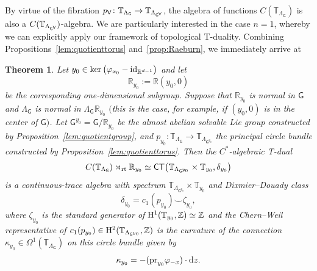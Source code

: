 \documentclass[10pt,a4paper]{amsart}
\numberwithin{equation}{section}
\newcommand{\C}{\complex}
\newcommand{\Z}{\zed}
\def\dd{{\rm d}}
\def\Id{{\rm id}}
\def\V{{\sf V}}
\def\T{{\sf T}}
\def\C{{\sf C}}
\newcommand{\sfG}{\mathsf{G}}
\newcommand{\rmH}{{\rm H}}
\newcommand{\rt}{{\rm rt}}
\newcommand{\R}{\real}
\newcommand{\complex}{{\mathbb C}} %
\newcommand{\zed}{{\mathbb Z}} %
\newcommand{\real}{{\mathbb R}} %
\newcommand{\torus}{{\mathbb T}} %
\newtheorem{Theorem}{Theorem}[section]
\begin{document}
By virtue of the fibration
$p_\V\colon \torus_{\Lambda_\sfG}\to\torus_{\Lambda_{\sfG^{\text{\tiny$\V$}}}}$, the
algebra of functions $C(\torus_{\Lambda_\sfG})$ is also a
$C(\torus_{\Lambda_{\sfG^{\text{\tiny$\V$}}}})$-algebra. We are particularly interested in the case $n=1$, whereby we can
explicitly apply our framework of topological T-duality. Combining
Propositions~\ref{lem:quotienttorus} and~\ref{prop:Raeburn}, we immediately arrive at
\begin{Theorem}\label{prop:RyTduality}
Let $y_0\in \ker\big(\varphi_{x_0}-\Id_{\R^{d-1}}\big)$ and let
\[
\R_{y_0}:=\R (y_0,0)
\]
be the corresponding one-dimensional subgroup. Suppose that $\R_{y_0}$ is normal
in $\sfG$ and $\Lambda_\sfG$ is normal in $\Lambda_\sfG \R_{y_0}$
$($this is the case, for example, if $(y_0,0)$ is in the center of $\sfG)$.
Let $\sfG^{y_0}=\sfG/\R_{y_0}$ be the almost abelian
solvable Lie group constructed by Proposition~{\rm \ref{lem:quotientgroup}}, and
$p_{y_0}\colon \torus_{\Lambda_{\sfG}}\to\torus_{\Lambda_{\sfG^{y_0}}}$ the
principal circle bundle
constructed by Proposition~{\rm \ref{lem:quotienttorus}}.
Then the $C^*$-algebraic T-dual
\[
C(\torus_{\Lambda_\sfG})\rtimes_\rt\R_{y_0} \simeq \C\T\big(\torus_{\Lambda_{\sfG^{y_0}}}\times\torus_{y_0},\delta_{y_0}\big)
\]
is a continuous-trace algebra with spectrum $\torus_{\Lambda_{\sfG^{y_0}}}\times\torus_{y_0}$
and Dixmier--Douady class
\[
\delta_{y_0}=c_1(p_{y_0})\smile \zeta_{y_0} ,
\]
where $\zeta_{y_0}$ is the standard
generator of $\rmH^1(\torus_{y_0},\Z)\simeq\Z$ and the Chern--Weil
representative of
$c_1(p_{y_0})\in\rmH^2(\torus_{\Lambda_{\sfG^{y_0}}},\Z)$
is the curvature of the connection
$\kappa_{y_0}\in\Omega^1(\torus_{\Lambda_{\sfG}})$ on this circle
bundle given by
\[
\kappa_{y_0} = - ({\rm pr}_{y_0} \varphi_{-x})\cdot\dd z .
\]
\end{Theorem}
\end{document}

